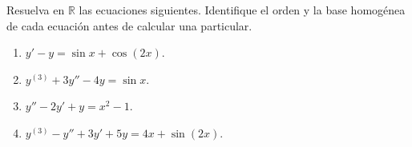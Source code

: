 Resuelva en $\mathbb R$ las ecuaciones siguientes. Identifique el orden y la base homogénea de cada ecuación antes de calcular una particular.

\begin{enumerate}[label=(\alph*),ref=\alph*,leftmargin=*]
\item $y'-y=\sin x+\cos(2x)$.
\item $y^{(3)}+3y''-4y=\sin x$.
\item $y''-2y'+y=x^2-1$.
\item $y^{(3)}-y''+3y'+5y=4x+\sin(2x)$.
\end{enumerate}
